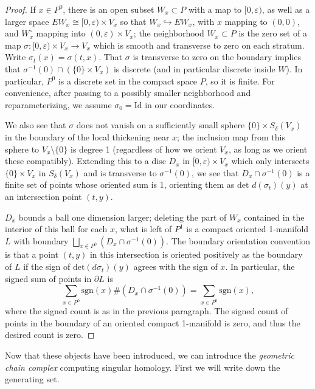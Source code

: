 \documentclass{memo-l}
\theoremstyle{definition}
\theoremstyle{remark}
\numberwithin{section}{chapter}
\numberwithin{equation}{chapter}
\begin{document}
\begin{proof}If $x \in P^0$, there is an open subset $W_x \subset P$ with a map to $[0,\varepsilon)$, as well as a larger space $EW_x \cong [0,\varepsilon) \times V_x$ so that $W_x \hookrightarrow EW_x$, with $x$ mapping to $(0,0)$, and $W_x^\circ$ mapping into $(0,\varepsilon) \times V_x$; the neighborhood $W_x \subset P$ is the zero set of a map $\sigma: [0,\varepsilon) \times V_x \to V_x$ which is smooth and transverse to zero on each stratum. Write $\sigma_t(x) = \sigma(t,x)$. That $\sigma$ is transverse to zero on the boundary implies that $\sigma^{-1}(0) \cap \left(\{0\} \times V_x\right)$ is discrete (and in particular discrete inside $W$). In particular, $P^0$ is a discrete set in the compact space $P$, so it is finite. For convenience, after passing to a possibly smaller neighborhood and reparameterizing, we assume $\sigma_0 = \text{Id}$ in our coordinates.

We also see that $\sigma$ does not vanish on a sufficiently small sphere $\{0\} \times S_\delta(V_x)$ in the boundary of the local thickening near $x$; the inclusion map from this sphere to $V_x \setminus \{0\}$ is degree 1 (regardless of how we orient $V_x$, as long as we orient these compatibly). Extending this to a disc $D_x$ in $[0,\varepsilon) \times V_x$ which only intersects $\{0\} \times V_x$ in $S_\delta(V_x)$ and is transverse to $\sigma^{-1}(0)$, we see that $D_x \cap \sigma^{-1}(0)$ is a finite set of points whose oriented sum is 1, orienting them as $\text{det }d(\sigma_t)(y)$ at an intersection point $(t,y)$.

$D_x$ bounds a ball one dimension larger; deleting the part of $W_x$ contained in the interior of this ball for each $x$, what is left of $P^1$ is a compact oriented 1-manifold $L$ with boundary $\bigsqcup_{x \in P^0} \left(D_x \cap \sigma^{-1}(0)\right)$. The boundary orientation convention is that a point $(t,y)$ in this intersection is oriented positively as the boundary of $L$ if the sign of $\text{det}(d\sigma_t)(y)$ agrees with the sign of $x$. In particular, the signed sum of points in $\partial L$ is $$\sum_{x \in P^0} \text{sgn}(x) \#\left(D_x \cap \sigma^{-1}(0)\right) = \sum_{x \in P^0} \text{sgn}(x),$$ where the signed count is as in the previous paragraph. The signed count of points in the boundary of an oriented compact 1-manifold is zero, and thus the desired count is zero.
\end{proof}

Now that these objects have been introduced, we can introduce the \emph{geometric chain complex} computing singular homology. First we will write down the generating set.
\end{document}
